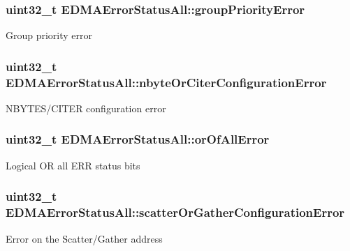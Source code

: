 \subsubsection[{\texorpdfstring{group\+Priority\+Error}{groupPriorityError}}]{\setlength{\rightskip}{0pt plus 5cm}uint32\+\_\+t E\+D\+M\+A\+Error\+Status\+All\+::group\+Priority\+Error}\hypertarget{unionEDMAErrorStatusAll_a26c5c967c7f4fac2fc2bf566ebd44d0c}{}\label{unionEDMAErrorStatusAll_a26c5c967c7f4fac2fc2bf566ebd44d0c}
Group priority error 
\subsubsection[{\texorpdfstring{nbyte\+Or\+Citer\+Configuration\+Error}{nbyteOrCiterConfigurationError}}]{\setlength{\rightskip}{0pt plus 5cm}uint32\+\_\+t E\+D\+M\+A\+Error\+Status\+All\+::nbyte\+Or\+Citer\+Configuration\+Error}\hypertarget{unionEDMAErrorStatusAll_aadf03605fe7361e9b20d659235ccfc3b}{}\label{unionEDMAErrorStatusAll_aadf03605fe7361e9b20d659235ccfc3b}
N\+B\+Y\+T\+E\+S/\+C\+I\+T\+ER configuration error 
\subsubsection[{\texorpdfstring{or\+Of\+All\+Error}{orOfAllError}}]{\setlength{\rightskip}{0pt plus 5cm}uint32\+\_\+t E\+D\+M\+A\+Error\+Status\+All\+::or\+Of\+All\+Error}\hypertarget{unionEDMAErrorStatusAll_a87b34020417245ce5e7e8664f474f7a8}{}\label{unionEDMAErrorStatusAll_a87b34020417245ce5e7e8664f474f7a8}
Logical OR all E\+RR status bits 
\subsubsection[{\texorpdfstring{scatter\+Or\+Gather\+Configuration\+Error}{scatterOrGatherConfigurationError}}]{\setlength{\rightskip}{0pt plus 5cm}uint32\+\_\+t E\+D\+M\+A\+Error\+Status\+All\+::scatter\+Or\+Gather\+Configuration\+Error}\hypertarget{unionEDMAErrorStatusAll_a8435402d23dae1727f257e5241e15f31}{}\label{unionEDMAErrorStatusAll_a8435402d23dae1727f257e5241e15f31}
Error on the Scatter/\+Gather address 
